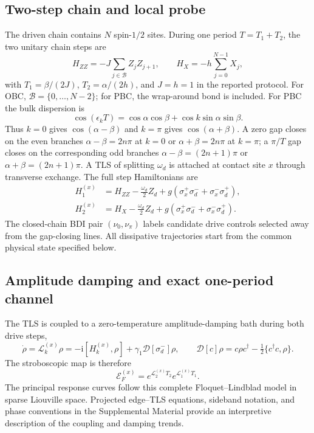 \documentclass[12pt]{article}
\newcommand{\ii}{\mathrm{i}}
\newcommand{\cD}{\mathcal{D}}
\newcommand{\cE}{\mathcal{E}}
\newcommand{\cL}{\mathcal{L}}
\begin{document}
\subsection{Two-step chain and local probe}

The driven chain contains $N$ spin-$1/2$ sites. During one period $T=T_1+T_2$, the two unitary chain steps are
\begin{equation}
H_{ZZ}=-J\sum_{j\in\mathcal B}Z_jZ_{j+1},\qquad
H_X=-h\sum_{j=0}^{N-1}X_j,
\end{equation}
with $T_1=\beta/(2J)$, $T_2=\alpha/(2h)$, and $J=h=1$ in the reported protocol. For OBC, $\mathcal B=\{0,\ldots,N-2\}$; for PBC, the wrap-around bond is included. For PBC the bulk dispersion is
\begin{equation}
\cos(\epsilon_kT)=\cos\alpha\cos\beta+\cos k\sin\alpha\sin\beta.
\label{eq:bulk-dispersion}
\end{equation}
Thus $k=0$ gives $\cos(\alpha-\beta)$ and $k=\pi$ gives $\cos(\alpha+\beta)$. A zero gap closes on the even branches $\alpha-\beta=2n\pi$ at $k=0$ or $\alpha+\beta=2n\pi$ at $k=\pi$; a $\pi/T$ gap closes on the corresponding odd branches $\alpha-\beta=(2n+1)\pi$ or $\alpha+\beta=(2n+1)\pi$. A TLS of splitting $\omega_d$ is attached at contact site $x$ through transverse exchange. The full step Hamiltonians are
\begin{align}
H_1^{(x)}&=H_{ZZ}-\frac{\omega_d}{2}Z_d+g(\sigma_x^+\sigma_d^-+\sigma_x^-\sigma_d^+),\\
H_2^{(x)}&=H_X-\frac{\omega_d}{2}Z_d+g(\sigma_x^+\sigma_d^-+\sigma_x^-\sigma_d^+).
\label{eq:step-hamiltonians}
\end{align}
The closed-chain BDI pair $(\nu_0,\nu_\pi)$ labels candidate drive controls selected away from the gap-closing lines. All dissipative trajectories start from the common physical state specified below.

\subsection{Amplitude damping and exact one-period channel}

The TLS is coupled to a zero-temperature amplitude-damping bath during both drive steps,
\begin{equation}
\dot\rho=\cL_k^{(x)}\rho=-\ii[H_k^{(x)},\rho]+\gamma_1\cD[\sigma_d^-]\rho,
\qquad
\cD[c]\rho=c\rho c^\dagger-\tfrac12\{c^\dagger c,\rho\}.
\label{eq:lindblad}
\end{equation}
The stroboscopic map is therefore
\begin{equation}
\cE_F^{(x)}=e^{\cL_2^{(x)}T_2}e^{\cL_1^{(x)}T_1}.
\label{eq:floquet-channel}
\end{equation}
The principal response curves follow this complete Floquet--Lindblad model in sparse Liouville space. Projected edge--TLS equations, sideband notation, and phase conventions in the Supplemental Material provide an interpretive description of the coupling and damping trends.
\end{document}

